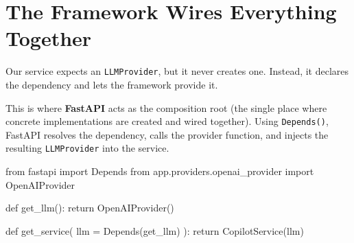 \documentclass[11pt]{article}
\begin{document}
\newpage


\section*{The Framework Wires Everything Together}
\vspace{0.1in}

Our service expects an \texttt{LLMProvider}, but it never creates one. Instead, it declares the dependency and lets the framework provide it.

This is where \textbf{FastAPI} acts as the composition root (the single place where concrete implementations are created and wired together). Using \texttt{Depends()}, FastAPI resolves the dependency, calls the provider function, and injects the resulting \texttt{LLMProvider} into the service.

\vspace{0.15in}

\begin{codebox}
from fastapi import Depends
from app.providers.openai_provider import OpenAIProvider

def get_llm():
    return OpenAIProvider()

def get_service(
    llm = Depends(get_llm)
):
    return CopilotService(llm)
\end{codebox}

\vspace{0.25in}
\end{document}
